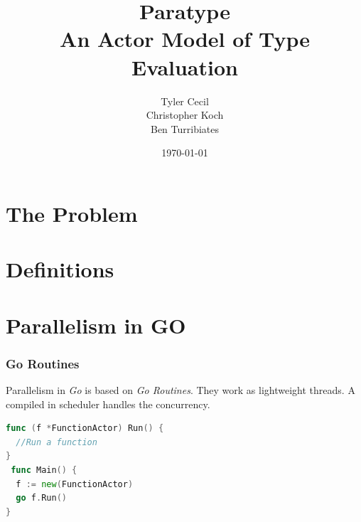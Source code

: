 \documentclass{beamer}
\begin{document}
\title[Paratype]{Paratype \\ An Actor Model of Type Evaluation}
\author{Tyler Cecil \\ Christopher Koch \\ Ben Turribiates}
\date{\today}

\frame{\titlepage}

\section{The Problem}





\section{Definitions}


\section{Parallelism in GO}


\begin{frame}[fragile]
  \frametitle{Go Routines}

  Parallelism in \emph{Go} is based on \emph{Go Routines}. They work
  as lightweight threads. A compiled in scheduler handles the
  concurrency.

  \begin{lstlisting}[language=Go]
func (f *FunctionActor) Run() {
  //Run a function
}
 func Main() {
  f := new(FunctionActor)
  go f.Run()
}
  \end{lstlisting}
\end{frame}
\end{document}
